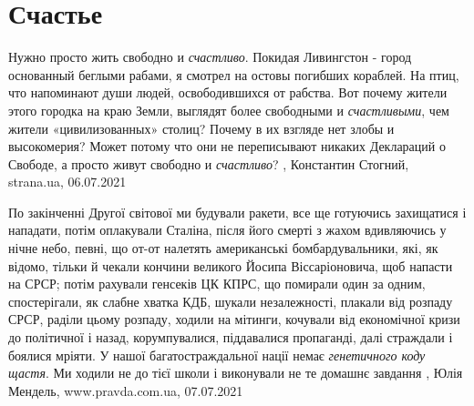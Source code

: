  
 
 
 
 
\chapter{Счастье}
\label{sec:slova.schastje}

Нужно просто жить свободно и \emph{счастливо}.  Покидая Ливингстон - город основанный
беглыми рабами, я смотрел на остовы погибших кораблей. На птиц, что напоминают
души людей, освободившихся от рабства.  Вот почему жители этого городка на краю
Земли, выглядят более свободными и \emph{счастливыми}, чем жители «цивилизованных»
столиц? Почему в их взгляде нет злобы и высокомерия? Может потому что они не
переписывают никаких Деклараций о Свободе, а просто живут свободно и \emph{счастливо}?
, 
Константин Стогний, strana.ua, 06.07.2021


По закінченні Другої світової ми будували ракети, все ще готуючись захищатися і
нападати, потім оплакували Сталіна, після його смерті з жахом вдивляючись у
нічне небо, певні, що от-от налетять американські бомбардувальники, які, як
відомо, тільки й чекали кончини великого Йосипа Віссаріоновича, щоб напасти на
СРСР; потім рахували генсеків ЦК КПРС, що помирали один за одним, спостерігали,
як слабне хватка КДБ, шукали незалежності, плакали від розпаду СРСР, раділи
цьому розпаду, ходили на мітинги, кочували від економічної кризи до політичної
і назад, корумпувалися, піддавалися пропаганді, далі страждали і боялися
мріяти.  У нашої багатостраждальної нації немає \emph{генетичного коду щастя}.
Ми ходили не до тієї школи і виконували не те домашнє завдання
, 
Юлія Мендель, www.pravda.com.ua, 07.07.2021

